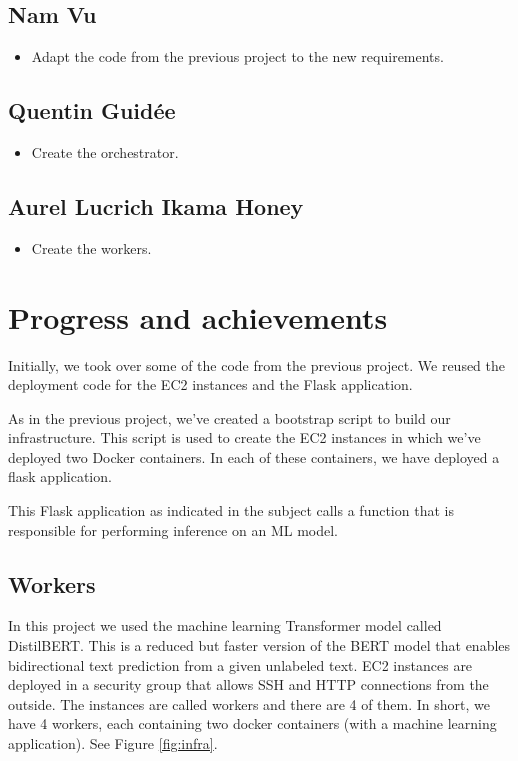 \documentclass[letterpaper,headings=standardclasses,parskip=half]{scrartcl}
\begin{document}
\subsection*{Nam Vu}

\begin{itemize}
    \item Adapt the code from the previous project to the new requirements.
\end{itemize}

\subsection*{Quentin Guidée}

\begin{itemize}
    \item Create the orchestrator.
\end{itemize}

\subsection*{Aurel Lucrich Ikama Honey}

\begin{itemize}
    \item Create the workers.
\end{itemize}

\section{Progress and achievements}

Initially, we took over some of the code from the previous project. We reused the deployment code for the EC2 instances and the Flask application.

As in the previous project, we've created a bootstrap script to build our infrastructure. This script is used to create the EC2 instances in which we've deployed two Docker containers. In each of these containers, we have deployed a flask application.

This Flask application as indicated in the subject calls a function that is responsible for performing inference on an ML model.

\subsection{Workers}

In this project we used the machine learning Transformer model called
DistilBERT. This is a reduced but faster version of the BERT model that enables
bidirectional text prediction from a given unlabeled text. EC2 instances are
deployed in a security group that allows SSH and HTTP connections from the
outside. The instances are called workers and there are 4 of them. In short, we
have 4 workers, each containing two docker containers (with a machine learning application). See Figure \ref{fig:infra}.
\end{document}
